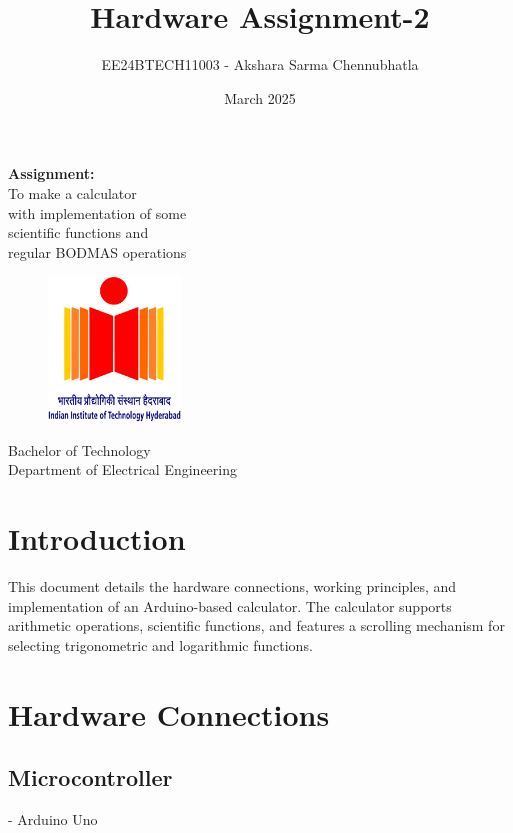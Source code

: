 \documentclass{article}
\title{Hardware Assignment-2}
\author{EE24BTECH11003 - Akshara Sarma Chennubhatla}
\date{March 2025}
\begin{document}
\maketitle
\begin{center}
	\textbf{Assignment:}\\To make a calculator\\with implementation of some\\scientific functions and\\regular BODMAS operations
\end{center}
\vspace{30pt}
\begin{figure}[h!]
	\centering
	\includegraphics[width = 100pt]{.logo/logo.png}\\
\end{figure}
\begin{center}
	Bachelor of Technology\\
	\vspace{10pt}
	Department of Electrical Engineering\\
\end{center}
\newpage

\maketitle


\tableofcontents
\newpage  

\section{Introduction}
This document details the hardware connections, working principles, and implementation of an Arduino-based calculator. The calculator supports arithmetic operations, scientific functions, and features a scrolling mechanism for selecting trigonometric and logarithmic functions.

\section{Hardware Connections}
\subsection{Microcontroller}
- Arduino Uno
\end{document}

